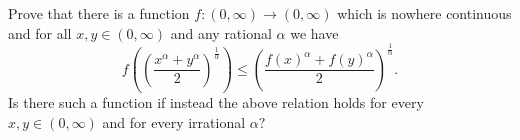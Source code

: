 Prove that there is a function ${f: (0,\infty) \rightarrow (0,\infty)}$ which is nowhere continuous and for all ${x,y \in (0,\infty)}$ and any rational ${\alpha}$ we have
\[ \displaystyle f\left( \left(\frac{x^\alpha+y^\alpha}{2}\right)^{\frac{1}{\alpha}}\right)\leq \left(\frac{f(x)^\alpha +f(y)^\alpha }{2}\right)^{\frac{1}{\alpha}}. \]
Is there such a function if instead the above relation holds for every ${x,y \in (0,\infty)}$ and for every irrational ${\alpha}?$

